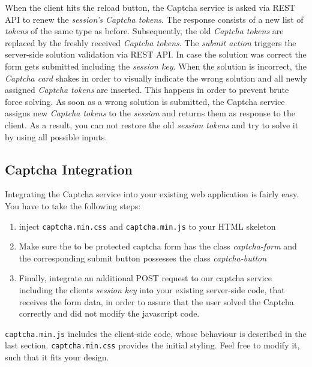  When the client hits the reload button, the Captcha service is asked via REST API to renew the \textit{session's Captcha tokens}. The response consists of a new list of \textit{tokens} of the same type as before. Subsequently, the old \textit{Captcha tokens} are replaced by the freshly received \textit{Captcha tokens}. The \textit{submit action} triggers the server-side solution validation via REST API. In case the solution was correct the form gets submitted including the \textit{session key}. When the solution is incorrect, the \textit{Captcha card} shakes in order to visually indicate the wrong solution and all newly assigned \textit{Captcha tokens} are inserted. This happens in order to prevent brute force solving. As soon as a wrong solution is submitted, the Captcha service assigns new \textit{Captcha tokens} to the \textit{session} and returns them as response to the client. As a result, you can not restore the old \textit{session tokens} and try to solve it by using all possible inputs.

\subsection{Captcha Integration}
\label{subsec:Captcha Integration}

Integrating the Captcha service into your existing web application is fairly easy. You have to take the following steps:
\begin{enumerate}
	\item inject \texttt{captcha.min.css} and \texttt{captcha.min.js} to your HTML skeleton
	\item  Make sure the to be protected captcha form has the class \textit{captcha-form} and the corresponding submit button possesses the class \textit{captcha-button}
	\item Finally, integrate an additional POST request to our captcha service including the clients \textit{session key} into your existing server-side code, that receives the form data, in order to assure that the user solved the Captcha correctly and did not modify the javascript code.
\end{enumerate}

\texttt{captcha.min.js} includes the client-side code, whose behaviour is described in the last section. \texttt{captcha.min.css} provides the initial styling. Feel free to modify it, such that it fits your design. 

\clearpage
